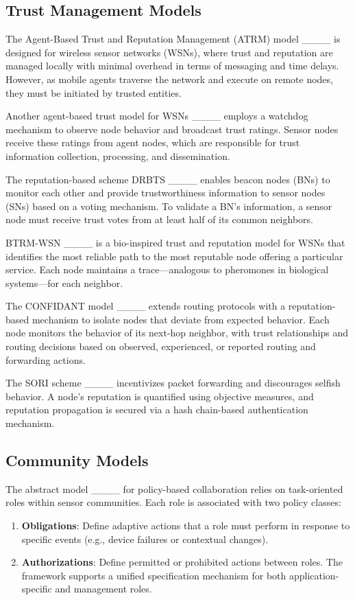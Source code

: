 \subsection{Trust Management Models}
The Agent-Based Trust and Reputation Management (ATRM) model ____ is designed for wireless sensor networks (WSNs), where trust and reputation are managed locally with minimal overhead in terms of messaging and time delays. However, as mobile agents traverse the network and execute on remote nodes, they must be initiated by trusted entities.

Another agent-based trust model for WSNs ____ employs a watchdog mechanism to observe node behavior and broadcast trust ratings. Sensor nodes receive these ratings from agent nodes, which are responsible for trust information collection, processing, and dissemination.

The reputation-based scheme DRBTS ____ enables beacon nodes (BNs) to monitor each other and provide trustworthiness information to sensor nodes (SNs) based on a voting mechanism. To validate a BN's information, a sensor node must receive trust votes from at least half of its common neighbors.

BTRM-WSN ____ is a bio-inspired trust and reputation model for WSNs that identifies the most reliable path to the most reputable node offering a particular service. Each node maintains a trace—analogous to pheromones in biological systems—for each neighbor.

The CONFIDANT model ____ extends routing protocols with a reputation-based mechanism to isolate nodes that deviate from expected behavior. Each node monitors the behavior of its next-hop neighbor, with trust relationships and routing decisions based on observed, experienced, or reported routing and forwarding actions.

The SORI scheme ____ incentivizes packet forwarding and discourages selfish behavior. A node's reputation is quantified using objective measures, and reputation propagation is secured via a hash chain-based authentication mechanism.

\subsection{Community Models}
The abstract model ____ for policy-based collaboration relies on task-oriented roles within sensor communities. Each role is associated with two policy classes:
\begin{enumerate}
 \item \textbf{Obligations}: Define adaptive actions that a role must perform in response to specific events (e.g., device failures or contextual changes).
 \item \textbf{Authorizations}: Define permitted or prohibited actions between roles. The framework supports a unified specification mechanism for both application-specific and management roles.
\end{enumerate}

